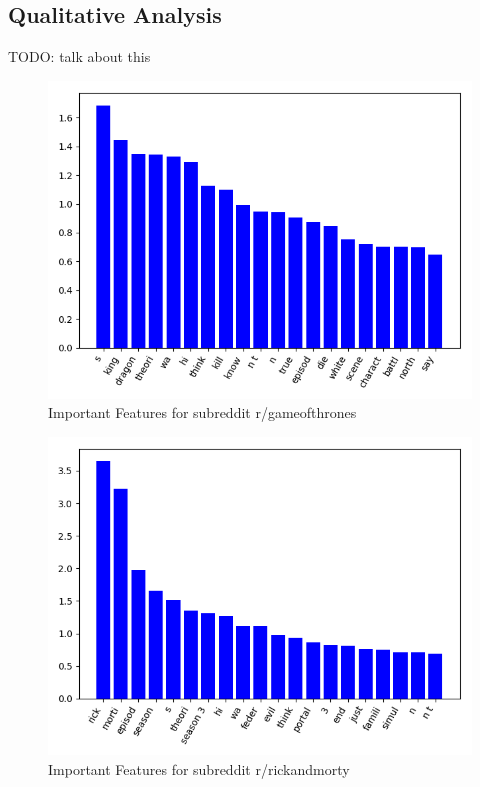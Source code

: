 \documentclass{sig-alternate-05-2015}
\begin{document}
\subsection{Qualitative Analysis}
TODO: talk about this

\begin{figure}[H]
\centering
\includegraphics[width=\linewidth]{plots/coefficients-gameofthrones-dim-337.png}
\caption{Important Features for subreddit r/gameofthrones}
\end{figure}

\begin{figure}[H]
\centering
\includegraphics[width=\linewidth]{plots/coefficients-rickandmorty-dim-713.png}
\caption{Important Features for subreddit r/rickandmorty}
\end{figure}
\end{document}
